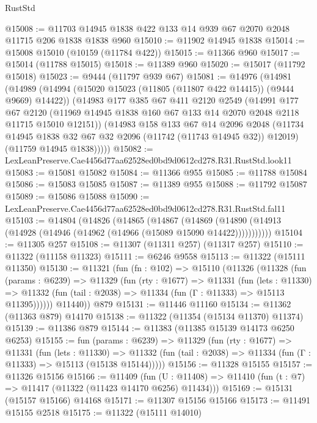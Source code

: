 \begin{lexlean}{RustStd}
\begin{coremodule}
@15008 := @11703 @14945 @1838 @422 @133 @14 @939 @67 @2070 @2048 @11715 @206 @1838 @1838 @960
@15010 := @11902 @14945 @1838
@15014 := @15008 @15010 (@10159 (@11784 @422))
@15015 := @11366 @960
@15017 := @15014 (@11788 @15015)
@15018 := @11389 @960
@15020 := @15017 (@11792 @15018)
@15023 := @9444 (@11797 @939 @67)
@15081 := @14976
    (@14981
      (@14989
        (@14994 (@15020 @15023 (@11805 (@11807 @422 @14415)) (@9444 @9669) @14422))
        (@14983
          @177
          @385
          @67
          @411
          @2120
          @2549
          (@14991
            @177
            @67
            @2120
            (@11969 @14945 @1838 @160 @67 @133 @14 @2070 @2048 @2118 @11715 @15010 @12151))
          (@14983
            @158
            @133
            @67
            @14
            @2096
            @2048
            (@11734 @14945 @1838 @32 @67 @32 @2096 (@11742 (@11743 @14945 @32)) @12019)
            (@11759 @14945 @1838)))))
@15082 := LexLeanPreserve.Cae4456d77aa62528ed0bd9d0612cd278.R31.RustStd.look11
@15083 := @15081 @15082
@15084 := @11366 @955
@15085 := @11788 @15084
@15086 := @15083 @15085
@15087 := @11389 @955
@15088 := @11792 @15087
@15089 := @15086 @15088
@15090 := LexLeanPreserve.Cae4456d77aa62528ed0bd9d0612cd278.R31.RustStd.fal11
@15103 := @14804
    (@14826
      (@14865
        (@14867
          (@14869 (@14890 (@14913 (@14928 (@14946 (@14962 (@14966 (@15089 @15090 @14422)))))))))))
@15104 := @11305 @257
@15108 := @11307 (@11311 @257) (@11317 @257)
@15110 := @11322 (@11158 @11323)
@15111 := @6246 @9558
@15113 := @11322 (@15111 @11350)
@15130 := @11321
    (fun (fn : @102) =>
    @15110
      (@11326
        (@11328
          (fun (params : @6239) =>
          @11329
            (fun (rty : @1677) =>
            @11331
              (fun (lets : @11330) =>
              @11332 (fun (tail : @2038) => @11334 (fun (Γ : @11333) => @15113 @11395))))))
        @11440))
    @879
@15131 := @11446 @11160
@15134 := @11362 (@11363 @879) @14170
@15138 := @11322 (@11354 (@15134 @11370) @11374)
@15139 := @11386 @879
@15144 := @11383 (@11385 @15139 @14173 @6250 @6253)
@15155 := fun (params : @6239) =>
  @11329
    (fun (rty : @1677) =>
    @11331
      (fun (lets : @11330) =>
      @11332 (fun (tail : @2038) => @11334 (fun (Γ : @11333) => @15113 (@15138 @15144)))))
@15156 := @11328 @15155
@15157 := @11326 @15156
@15166 := @11409
    (fun (U : @11408) => @11410 (fun (t : @7) => @11417 (@11322 (@11423 @14170 @6256) @11434)))
@15169 := @15131 (@15157 @15166) @14168
@15171 := @11307 @15156 @15166
@15173 := @11491 @15155 @2518
@15175 := @11322 (@15111 @14010)

\end{coremodule}
\end{lexlean}
